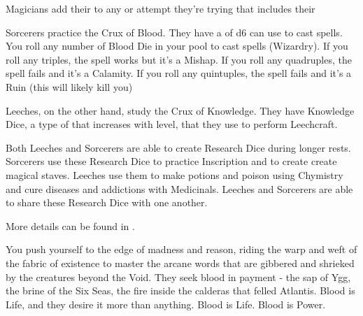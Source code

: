 {  

  Magicians add their \LVL to any \RO or \RB  attempt they're trying that includes their \INT

  \cbreak


  Sorcerers practice the Crux of Blood. They have a \POOL of d6 can use to cast spells.  You roll any number of Blood Die in your pool to cast spells (Wizardry). If you roll any triples, the spell works but it's a Mishap. If you roll any quadruples, the spell fails and it's a Calamity. If you roll any quintuples, the spell fails and it's a Ruin (this will likely kill you)

  Leeches, on the other hand, study the Crux of Knowledge.  They have Knowledge Dice, a type of \STATIC that increases with level, that they use to perform Leechcraft.

  Both Leeches and Sorcerers are able to create Research Dice during longer rests.  Sorcerers use these Research Dice to practice Inscription and to create create magical staves.  Leeches use them to make potions and poison using Chymistry and cure diseases and addictions with Medicinals.  Leeches and Sorcerers are able to share these Research Dice with one another.

  More details can be found in .

  \newpage



  You push yourself to the edge of madness and reason, riding the warp and weft of the fabric of existence to master the arcane words that are gibbered and shrieked by the creatures beyond the Void.  They seek blood in payment - the sap of  Ygg, the brine of the Six Seas, the fire inside the calderas that felled Atlantis.  Blood is Life, and they desire it more than anything.  Blood is Life.  Blood is Power.


}
